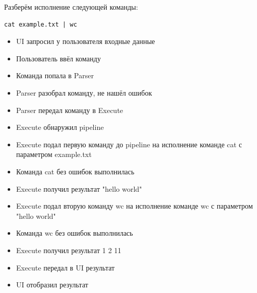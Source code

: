 \documentclass[a4paper,12pt]{article}
\begin{document}
Разберём исполнение следующей команды:
\begin{verbatim}
cat example.txt | wc
\end{verbatim}

\begin{itemize}
	\item UI запросил у пользователя входные данные
	\item Пользователь ввёл команду
	\item Команда попала в Parser
	\item Parser разобрал команду, не нашёл ошибок
	\item Parser передал команду в Execute
	\item Execute обнаружил pipeline
	\item Execute подал первую команду до pipeline на исполнение команде cat с параметром example.txt
	\item Команда cat без ошибок выполнилась
	\item Execute получил результат "hello world"
	\item Execute подал вторую команду wc на исполнение команде wc с параметром "hello world"
	\item Команда wc без ошибок выполнилась
	\item Execute получил результат 1 2 11
	\item Execute передал в UI результат
	\item UI отобразил результат
\end{itemize}
\end{document}
